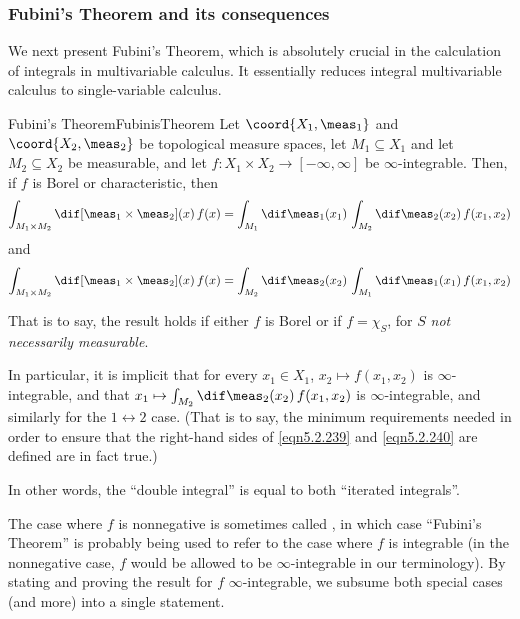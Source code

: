 \subsubsection{Fubini's Theorem and its consequences}

We next present Fubini's Theorem, which is absolutely crucial in the calculation of integrals in multivariable calculus.  It essentially reduces integral multivariable calculus to single-variable calculus.
\begin{thm}{Fubini's Theorem}{FubinisTheorem}
Let $\coord{X_1,\meas _1}$ and $\coord{X_2,\meas _2}$ be topological measure spaces, let $M_1\subseteq X_1$ and let $M_2\subseteq X_2$ be measurable, and let $f\colon X_1\times X_2\rightarrow [-\infty ,\infty ]$ be $\infty$-integrable.  Then, if $f$ is Borel or characteristic, then
{\tiny
\begin{equation}\label{eqn5.2.239}
\int _{M_1\times M_2}\dif [\meas _1\times \meas _2](x)\, f(x)=\int _{M_1}\dif \meas _1(x_1)\, \int _{M_2}\dif \meas _2(x_2)\, f(x_1,x_2)
\end{equation}
}
and
{\tiny
\begin{equation}\label{eqn5.2.240}
\int _{M_1\times M_2}\dif [\meas _1\times \meas _2](x)\, f(x)=\int _{M_2}\dif \meas _2(x_2)\, \int _{M_1}\dif \meas _1(x_1)\, f(x_1,x_2)
\end{equation}
}
\begin{rmk}
That is to say, the result holds if either $f$ is Borel or if $f=\chi _S$, for $S$ \emph{not necessarily measurable}.
\end{rmk}
\begin{rmk}
In particular, it is implicit that for every $x_1\in X_1$, $x_2\mapsto f(x_1,x_2)$ is $\infty$-integrable, and that $x_1\mapsto \int _{M_2}\dif \meas _2(x_2)\, f(x_1,x_2)$ is $\infty$-integrable, and similarly for the $1\leftrightarrow 2$ case.  (That is to say, the minimum requirements needed in order to ensure that the right-hand sides of \eqref{eqn5.2.239} and \eqref{eqn5.2.240} are defined are in fact true.)
\end{rmk}
\begin{rmk}
In other words, the ``double integral'' is equal to both ``iterated integrals''.
\end{rmk}
\begin{rmk}
The case where $f$ is nonnegative is sometimes called , in which case ``Fubini's Theorem'' is probably being used to refer to the case where $f$ is integrable (in the nonnegative case, $f$ would be allowed to be $\infty$-integrable in our terminology).  By stating and proving the result for $f$ $\infty$-integrable, we subsume both special cases (and more) into a single statement.

\end{rmk}
\end{thm}
